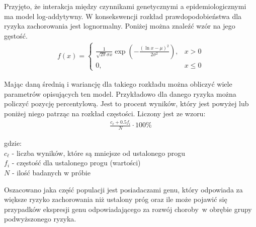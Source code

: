 \documentclass[licencjacka]{pwr_wmat_praca_dyplomowa}
\theoremstyle{plain}
\numberwithin{theorem}{chapter}
\theoremstyle{definition}
\numberwithin{theorem}{chapter}
\begin{document}
Przyjęto, że interakcja między czynnikami genetycznymi a epidemiologicznymi ma model log-addytywny. W konsekswencji rozkład prawdopodobieństwa dla ryzyka zachorowania jest lognormalny. Poniżej można znaleźć wzór na jego gęstość.
\begin{align*}
f(x) = \left\{\begin{array}{ll}\frac{1}{\sqrt{2\pi}\sigma x} \exp\left(-\frac{(\ln x - \mu)^2}{2\sigma^2} \right), & x> 0 \\ 0, & x\leqslant 0 \end{array} \right.
\end{align*}

Mając daną średnią i wariancję dla takiego rozkładu można obliczyć wiele parametrów opisujących ten model. Przykładowo dla danego ryzyka można policzyć pozycję percentylową. Jest to procent wyników, który jest powyżej lub poniżej niego patrząc na rozkład częstości. Liczony jest ze wzoru:
\begin{align}
\frac{c_{\ell}+0.5f_i}{N}\cdot 100\%
\end{align}
 
\noindent    gdzie: \\
$c_{\ell}$ - liczba wyników, które są mniejsze od ustalonego progu \\
$f_i$ - częstość dla ustalonego progu (wartości) \\
$N$ - ilość badanych w próbie

Oszacowano jaka część populacji jest posiadaczami genu, który odpowiada za większe ryzyko zachorowania niż ustalony próg oraz ile może pojawić się przypadków ekspresji genu odpowiadającego za rozwój choroby~w obrębie grupy podwyższonego ryzyka.
\end{document}
